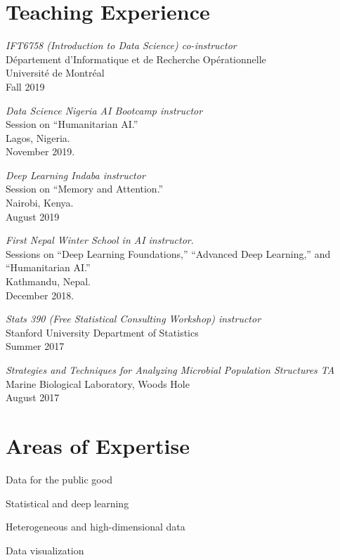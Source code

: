 \documentclass[letterpaper]{article}
\renewenvironment{itemize}{
  \begin{list}{}{
    \setlength{\leftmargin}{1.5em}
  }
}{
  \end{list}
}
\begin{document}
\section*{Teaching Experience}
\begin{itemize}
\item \textit{IFT6758 (Introduction to Data Science) co-instructor} \\
D\'epartement d'Informatique et de Recherche Op\'erationnelle \\
Universit\'e de Montr\'eal \\
Fall 2019 
\item \textit{Data Science Nigeria AI Bootcamp instructor} \\
Session on ``Humanitarian AI.'' \\
Lagos, Nigeria. \\
November 2019.
\item \textit{Deep Learning Indaba instructor} \\
Session on ``Memory and Attention.'' \\
Nairobi, Kenya. \\
August 2019
\item \textit{First Nepal Winter School in AI instructor}. \\
Sessions on ``Deep Learning Foundations,'' ``Advanced Deep Learning,'' and ``Humanitarian AI.'' \\
Kathmandu, Nepal. \\
December 2018.
\item \textit{Stats 390 (Free Statistical Consulting Workshop) instructor} \\
  Stanford University Department of Statistics \\
  Summer 2017 
\item \textit{Strategies and Techniques for Analyzing Microbial Population Structures TA} \\
  Marine Biological Laboratory, Woods Hole\\
  August 2017
\end{itemize}

\section*{Areas of Expertise}
\begin{itemize}
  \item Data for the public good
  \item Statistical and deep learning
  \item Heterogeneous and high-dimensional data
  \item Data visualization
\end{itemize}
\end{document}
